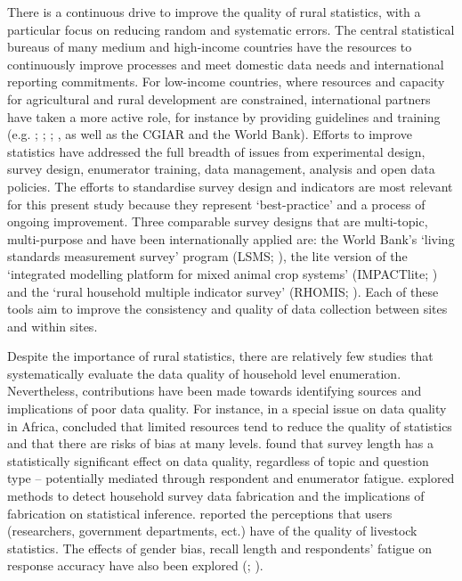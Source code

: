 There is a continuous drive to improve the quality of rural statistics, with a particular focus on reducing random and systematic errors. The central statistical bureaus of many medium and high-income countries have the resources to continuously improve processes and meet domestic data needs and international reporting commitments. For low-income countries, where resources and capacity for agricultural and rural development are constrained, international partners have taken a more active role, for instance by providing guidelines and training (e.g. \citealp{FAO2017}; \citealp{UNFCCC2012}; \citealp{OECD2009}; \citealp{UnitedNationsDepartmentofEconomicandSocialAffairs2005}, as well as the CGIAR and the World Bank). Efforts to improve statistics have addressed the full breadth of issues from experimental design, survey design, enumerator training, data management, analysis and open data policies. The efforts to standardise survey design and indicators are most relevant for this present study because they represent `best-practice' and a process of ongoing improvement. Three comparable survey designs that are multi-topic, multi-purpose and have been internationally applied are: the World Bank's `living standards measurement survey' program (LSMS; \citealp{WorldBanka}), the lite version of the `integrated modelling platform for mixed animal crop systems' (IMPACTlite; \citealp{Herrero2007}) and the `rural household multiple indicator survey' (RHOMIS; \citealp{Hammond2017225}). Each of these tools aim to improve the consistency and quality of data collection between sites and within sites.

Despite the importance of rural statistics, there are relatively few studies that systematically evaluate the data quality of household level enumeration. Nevertheless, contributions have been made towards identifying sources and implications of poor data quality. For instance, in a special issue on data quality in Africa, \citet{Jerven2015} concluded that limited resources tend to reduce the quality of statistics and that there are risks of bias at many levels. \citet{Kilic2015} found that survey length has a statistically significant effect on data quality, regardless of topic and question type -- potentially mediated through respondent and enumerator fatigue. \citet{Finn2017} explored methods to detect household survey data fabrication and the implications of fabrication on statistical inference. \citet{Pica-ciamarra2012} reported the perceptions that users (researchers, government departments, ect.) have of the quality of livestock statistics. The effects of gender bias, recall length and respondents' fatigue on response accuracy have also been explored (\citealp{DeNicola2014}; \citealp{Beegle2012}).

